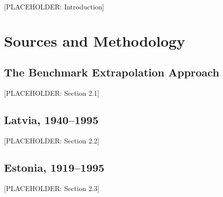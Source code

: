 \documentclass[12pt,a4paper]{article}
\begin{document}
[PLACEHOLDER: Introduction]


\section{Sources and Methodology}
\label{sec:methodology}

\subsection{The Benchmark Extrapolation Approach}
\label{sec:methodology-approach}

[PLACEHOLDER: Section 2.1]

\subsection{Latvia, 1940--1995}
\label{sec:methodology-latvia}

[PLACEHOLDER: Section 2.2]

\subsection{Estonia, 1919--1995}
\label{sec:methodology-estonia}

[PLACEHOLDER: Section 2.3]
\end{document}
